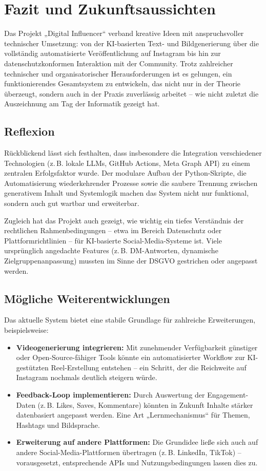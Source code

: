 \documentclass[a4paper,12pt]{article}
\begin{document}
\section{Fazit und Zukunftsaussichten}

Das Projekt „Digital Influencer“ verband kreative Ideen mit anspruchsvoller technischer Umsetzung: von der KI-basierten Text- und Bildgenerierung über die vollständig automatisierte Veröffentlichung auf Instagram bis hin zur datenschutzkonformen Interaktion mit der Community. Trotz zahlreicher technischer und organisatorischer Herausforderungen ist es gelungen, ein funktionierendes Gesamtsystem zu entwickeln, das nicht nur in der Theorie überzeugt, sondern auch in der Praxis zuverlässig arbeitet – wie nicht zuletzt die Auszeichnung am Tag der Informatik gezeigt hat.

\subsection{Reflexion}

Rückblickend lässt sich festhalten, dass insbesondere die Integration verschiedener Technologien (z.\,B. lokale LLMs, GitHub Actions, Meta Graph API) zu einem zentralen Erfolgsfaktor wurde. Der modulare Aufbau der Python-Skripte, die Automatisierung wiederkehrender Prozesse sowie die saubere Trennung zwischen generativem Inhalt und Systemlogik machen das System nicht nur funktional, sondern auch gut wartbar und erweiterbar.

Zugleich hat das Projekt auch gezeigt, wie wichtig ein tiefes Verständnis der rechtlichen Rahmenbedingungen – etwa im Bereich Datenschutz oder Plattformrichtlinien – für KI-basierte Social-Media-Systeme ist. Viele ursprünglich angedachte Features (z.\,B. DM-Antworten, dynamische Zielgruppenanpassung) mussten im Sinne der DSGVO gestrichen oder angepasst werden.

\subsection{Mögliche Weiterentwicklungen}

Das aktuelle System bietet eine stabile Grundlage für zahlreiche Erweiterungen, beispielsweise:

\begin{itemize}
    \item \textbf{Videogenerierung integrieren:} Mit zunehmender Verfügbarkeit günstiger oder Open-Source-fähiger Tools könnte ein automatisierter Workflow zur KI-gestützten Reel-Erstellung entstehen – ein Schritt, der die Reichweite auf Instagram nochmals deutlich steigern würde.
    \item \textbf{Feedback-Loop implementieren:} Durch Auswertung der Engagement-Daten (z.\,B. Likes, Saves, Kommentare) könnten in Zukunft Inhalte stärker datenbasiert angepasst werden. Eine Art „Lernmechanismus“ für Themen, Hashtags und Bildsprache.
    \item \textbf{Erweiterung auf andere Plattformen:} Die Grundidee ließe sich auch auf andere Social-Media-Plattformen übertragen (z.\,B. LinkedIn, TikTok) – vorausgesetzt, entsprechende APIs und Nutzungsbedingungen lassen dies zu.
\end{itemize}
\end{document}
